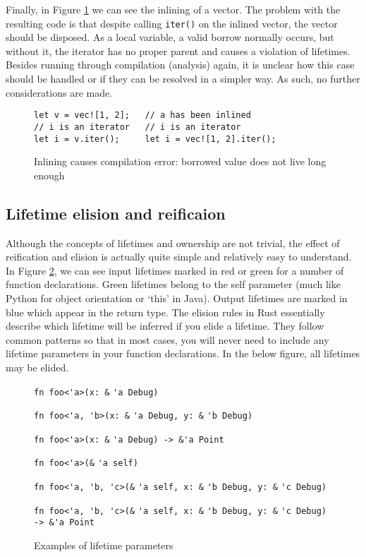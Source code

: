Finally, in Figure \ref{Fig:inlinefail} we can see the inlining of a vector. The problem with the resulting code is that despite calling {\verb|iter()|} on the inlined vector, the vector should be disposed. As a local variable, a valid borrow normally occurs, but without it, the iterator has no proper parent and causes a violation of lifetimes. Besides running through compilation (analysis) again, it is unclear how this case should be handled or if they can be resolved in a simpler way. As such, no further considerations are made.

\begin{figure}[h]
\begin{verbatim}
let v = vec![1, 2];   // a has been inlined
// i is an iterator   // i is an iterator     
let i = v.iter();     let i = vec![1, 2].iter();
\end{verbatim}
\caption{Inlining causes compilation error: borrowed value does not live long enough}
\label{Fig:inlinefail}
\end{figure}

\subsection{Lifetime elision and reificaion}

Although the concepts of lifetimes and ownership are not trivial, the effect of reification and elision is actually quite simple and relatively easy to understand. In Figure \ref{Fig:lifetimes}, we can see input lifetimes marked in red or green for a number of function declarations. Green lifetimes belong to the self parameter (much like Python for object orientation or `this' in Java). Output lifetimes are marked in blue which appear in the return type. The elision rules in Rust essentially describe which lifetime will be inferred if you elide a lifetime. They follow common patterns so that in most cases, you will never need to include any lifetime parameters in your function declarations. In the below figure, all lifetimes may be elided.

\begin{figure}
{\verb|fn foo<'a>(x: &|}
{\color{red} \verb|'a|}{\verb| Debug)|}

{\verb|fn foo<'a, 'b>(x: &|}
{\color{red} \verb|'a|}{\verb| Debug, y: &|}{\color{red} \verb|'b|}{\verb| Debug)|}

{\verb|fn foo<'a>(x: &|}
{\color{red} \verb|'a|}{\verb| Debug) -> &|}{\color{blue}\verb|'a|}{\verb| Point|}

{\verb|fn foo<'a>(&|}
{\color{green} \verb|'a|}{\verb| self)|}

{\verb|fn foo<'a, 'b, 'c>(&|}
{\color{green} \verb|'a|}{\verb| self, x: &|}{\color{red} \verb|'b|}{\verb| Debug, y: &|}
{\color{red} \verb|'c|}{\verb| Debug)|}

{\verb|fn foo<'a, 'b, 'c>(&|}
{\color{green} \verb|'a|}{\verb| self, x: &|}{\color{red} \verb|'b|}{\verb| Debug, y: &|}
{\color{red}\verb|'c|}{\verb| Debug) -> &|}{\color{blue}\verb|'a|}{\verb| Point|}

\caption{Examples of lifetime parameters}
\label{Fig:lifetimes}
\end{figure}

